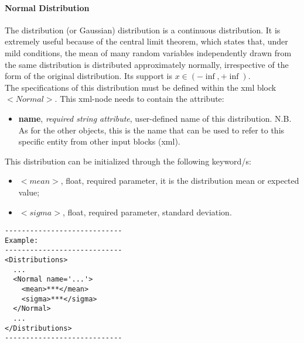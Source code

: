 \paragraph{Normal Distribution}
\label{Normal}
The  distribution (or Gaussian) distribution is a
continuous distribution. It is extremely useful because of the central limit theorem, which states that, under mild conditions, the mean of many random variables independently drawn from the same distribution is distributed approximately normally, irrespective of the form of the original distribution. Its support is $x \in (-\inf, +\inf)$.
\\ The specifications of this distribution must be defined within the xml block $<Normal>$. This xml-node needs to contain the attribute:
\vspace{-5mm}
\begin{itemize}
\itemsep0em
\item \textbf{name}, \textit{required string attribute}, user-defined name of this distribution. N.B. As for the other objects, this is the name that can be used to refer to this specific entity from other input blocks (xml).   
\end{itemize}
\vspace{-5mm}
This distribution can be initialized through the following keyword/s:
\begin{itemize}
\item $<mean>$, float, required parameter, it is the distribution mean or expected value;
\item $<sigma>$, float, required parameter, standard deviation.
\end{itemize}

\begin{lstlisting}[style=XML]
----------------------------
Example:
----------------------------
<Distributions>
  ...
  <Normal name='...'>
    <mean>***</mean>
    <sigma>***</sigma>
  </Normal>
  ...
</Distributions>
----------------------------
\end{lstlisting}




